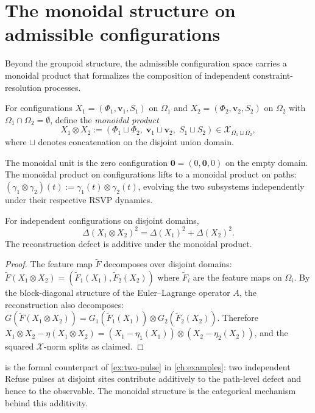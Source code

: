\documentclass[12pt, oneside]{memoir}
\newcommand{\X}{\mathcal{X}}
\newcommand{\Ft}{\widetilde{F}}
\newcommand{\bv}{\mathbf{v}}
\begin{document}
\section{The monoidal structure on admissible configurations}

Beyond the groupoid structure, the admissible configuration space carries a monoidal
product that formalizes the composition of independent constraint-resolution processes.

\begin{definition}
\label{def:monoidal}
For configurations $X_1 = (\Phi_1, \bv_1, S_1)$ on $\Omega_1$ and $X_2 = (\Phi_2,
\bv_2, S_2)$ on $\Omega_2$ with $\Omega_1 \cap \Omega_2 = \emptyset$, define the
\emph{monoidal product}
\[
  X_1 \otimes X_2 := (\Phi_1 \sqcup \Phi_2,\; \bv_1 \sqcup \bv_2,\; S_1 \sqcup S_2)
  \in \X_{\Omega_1 \sqcup \Omega_2},
\]
where $\sqcup$ denotes concatenation on the disjoint union domain.
\end{definition}

The monoidal unit is the zero configuration $\mathbf{0} = (0,\mathbf{0},0)$ on the
empty domain.  The monoidal product on configurations lifts to a monoidal product on
paths: $(\gamma_1 \otimes \gamma_2)(t) := \gamma_1(t) \otimes \gamma_2(t)$, evolving
the two subsystems independently under their respective RSVP dynamics.

\begin{proposition}
\label{prop:defect-monoidal}
For independent configurations on disjoint domains,
\[
  \Delta(X_1 \otimes X_2)^2 = \Delta(X_1)^2 + \Delta(X_2)^2.
\]
The reconstruction defect is additive under the monoidal product.
\end{proposition}

\begin{proof}
The feature map $\Ft$ decomposes over disjoint domains: $\Ft(X_1 \otimes X_2) =
(\Ft_1(X_1), \Ft_2(X_2))$ where $\Ft_i$ are the feature maps on $\Omega_i$.  By the
block-diagonal structure of the Euler--Lagrange operator $A$, the reconstruction also
decomposes: $G(\Ft(X_1 \otimes X_2)) = G_1(\Ft_1(X_1)) \otimes G_2(\Ft_2(X_2))$.
Therefore $X_1 \otimes X_2 - \eta(X_1 \otimes X_2) = (X_1 - \eta_1(X_1)) \otimes
(X_2 - \eta_2(X_2))$, and the squared $\X$-norm splits as claimed.
\end{proof}

\begin{remark}
 is the formal counterpart of \cref{ex:two-pulse} in
\cref{ch:examples}: two independent Refuse pulses at disjoint sites contribute
additively to the path-level defect and hence to the observable.  The monoidal structure
is the categorical mechanism behind this additivity.
\end{remark}
\end{document}

